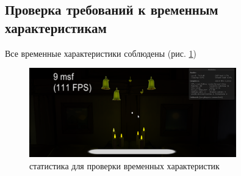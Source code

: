 \newpage
\subsection{Проверка требований к временным характеристикам}
Все временные характеристики соблюдены (рис. \ref{stats})
\begin{figure}[h!]
    \centering
    \includegraphics[width=0.8\textwidth]{./screenshots/stats.png}
    \caption{статистика для проверки временных характеристик}
    \label{stats}
\end{figure}



